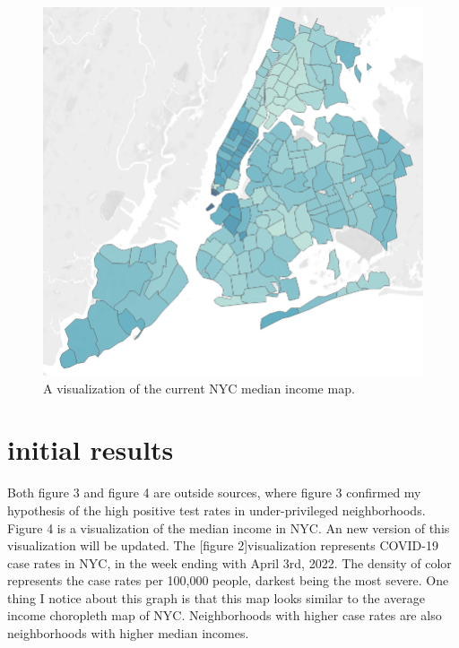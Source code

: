 \documentclass{vgtc}                 %
\begin{document}
\begin{figure}[tb]
 \centering %
 \includegraphics[width=\columnwidth]{income-choropleth.png}
 \caption{A visualization of the current NYC median income map.}
 \label{fig:sample}
\end{figure}


\section{initial results}
Both figure 3 and figure 4 are outside sources, where figure 3 confirmed my hypothesis of the high positive test rates in under-privileged neighborhoods. Figure 4 is a visualization of the median income in NYC. An new version of this visualization will be updated. The [figure 2]visualization represents COVID-19 case rates in NYC, in the week ending with April 3rd, 2022. The density of color represents the case rates per 100,000 people, darkest being the most severe. One thing I notice about this graph is that this map looks similar to the average income choropleth map of NYC. Neighborhoods with higher case rates are also neighborhoods with higher median incomes. 

\end{document}
